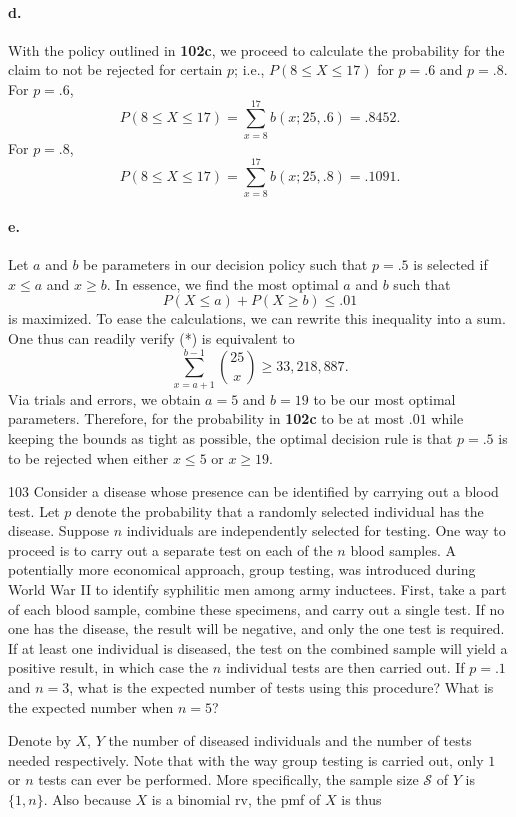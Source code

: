 \documentclass{exam}
\begin{document}
\paragraph{d.} With the policy outlined in \textbf{102c}, we proceed to calculate the probability for the claim to not be rejected for certain $p$; i.e., $P(8 \le X \le 17)$ for $p = .6$ and $p = .8$. For $p = .6$,
\[
	P(8 \le X \le 17) = \sum_{x = 8}^{17} b(x; 25, .6) = .8452.
\]
For $p = .8$,
\[
	P(8 \le X \le 17) = \sum_{x = 8}^{17} b(x; 25, .8) = .1091.
\]

\paragraph{e.} Let $a$ and $b$ be parameters in our decision policy such that $p = .5$ is selected if $x \le a$ and $x \ge b$. In essence, we find the most optimal $a$ and $b$ such that
\[
	P(X \le a) + P(X \ge b) \le .01 \tag{*}
\]
is maximized. To ease the calculations, we can rewrite this inequality into a sum. One thus can readily verify (*) is equivalent to
\[
	\sum_{x = a + 1}^{b - 1} \binom{25}x \ge 33,218,887.
\]
Via trials and errors, we obtain $a = 5$ and $b = 19$ to be our most optimal parameters. Therefore, for the probability in \textbf{102c} to be at most $.01$ while keeping the bounds as tight as possible, the optimal decision rule is that $p = .5$ is to be rejected when either $x \le 5$ or $x \ge 19$.
\newpage
\begin{problem}{103}
	Consider a disease whose presence can be identified by carrying out a blood test. Let $p$ denote the probability that a randomly selected individual has the disease. Suppose $n$ individuals are independently selected for testing. One way to proceed is to carry out a separate test on each of the $n$ blood samples. A potentially more economical approach, group testing, was introduced during World War II to identify syphilitic men among army inductees. First, take a part of each blood sample, combine these specimens, and carry out a single test. If no one has the disease, the result will be negative, and only the one test is required. If at least one individual is diseased, the test on the combined sample will yield a positive result, in which case the $n$ individual tests are then carried out. If $p = .1$ and $n = 3$, what is the expected number of tests using this procedure? What is the expected number when $n = 5$?
\end{problem}
Denote by $X$, $Y$ the number of diseased individuals and the number of tests needed respectively. Note that with the way group testing is carried out, only $1$ or $n$ tests can ever be performed. More specifically, the sample size $\mathcal S$ of $Y$ is $\{1, n\}$. Also because $X$ is a binomial rv, the pmf of $X$ is thus
\end{document}

